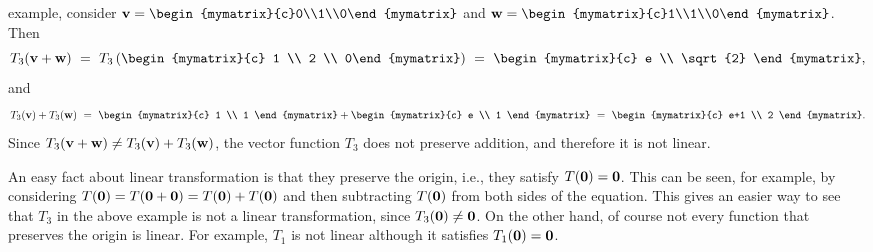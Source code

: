 \begin{solution}
\begin{enumerate}
    example, consider
    $\vect{v}=\begin{mymatrix}{c}0\\1\\0\end{mymatrix}$ and
    $\vect{w}=\begin{mymatrix}{c}1\\1\\0\end{mymatrix}$.
    Then
    \begin{equation*}
      T_3(\vect{v}+\vect{w})
      ~=~ T_3\paren{\begin{mymatrix}{c} 1 \\ 2 \\ 0\end{mymatrix}}
      ~=~ \begin{mymatrix}{c} e \\ \sqrt{2} \end{mymatrix},
    \end{equation*}
    and
    \begin{equation*}
      T_3(\vect{v})+T_3(\vect{w})
      ~=~ \begin{mymatrix}{c} 1 \\ 1 \end{mymatrix}
      + \begin{mymatrix}{c} e \\ 1 \end{mymatrix}
      ~=~ \begin{mymatrix}{c} e+1 \\ 2 \end{mymatrix}.
    \end{equation*}
    Since $T_3(\vect{v}+\vect{w})\neq T_3(\vect{v})+T_3(\vect{w})$,
    the vector function $T_3$ does not preserve addition, and therefore
    it is not linear.
  \end{enumerate}
\end{solution}

An easy fact about linear transformation is that they preserve the
origin, i.e., they satisfy $T(\vect{0}) = \vect{0}$. This can be seen,
for example, by considering
$T(\vect{0}) = T(\vect{0}+\vect{0}) = T(\vect{0}) + T(\vect{0})$ and
then subtracting $T(\vect{0})$ from both sides of the equation.  This
gives an easier way to see that $T_3$ in the above example is not a
linear transformation, since $T_3(\vect{0}) \neq \vect{0}$. On the
other hand, of course not every function that preserves the origin is
linear. For example, $T_1$ is not linear although it satisfies
$T_1(\vect{0})=\vect{0}$.

